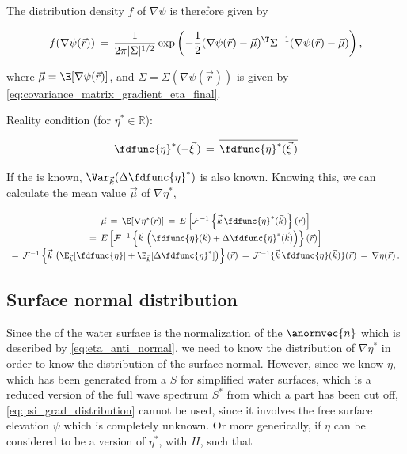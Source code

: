 The distribution density $f$ of $\nabla\psi$ is therefore given by

\begin{equation} \label{eq:psi_grad_distribution}
f(\nabla\psi(\vec{r})) \,=\, \frac{1}{2\pi|\Sigma|^{1/2}}\exp\left(-\frac{1}{2}(\nabla\psi(\vec{r})-\vec{\mu})^{\T}\Sigma^{-1}(\nabla\psi(\vec{r})-\vec{\mu})\right),
\end{equation}

where $\vec{\mu} = \E[\nabla\psi(\vec{r})]$, and $\Sigma = \Sigma(\nabla\psi(\vec{r}))$ is given by \eqref{eq:covariance_matrix_gradient_eta_final}.

\comment
{
\HRule

Reality condition (for $\eta^*\in\mathbb{R}$):

\begin{equation}
\fdfunc{\eta}^*(-\vec{\xi}\,) \,=\, \overline{\fdfunc{\eta}^*(\vec{\xi}\,)}
\end{equation}

\HRule

If the  is known, $\Var_{\vec{k}}(\Delta\fdfunc{\eta}^*)$ is also known. Knowing this, we can calculate the mean value $\vec{\mu}$ of $\nabla\eta^*$,

\begin{equation}
\renewcommand*{\arraystretch}{1.5}
\begin{array}{c}
\vec{\mu} \,=\, \E[\nabla\eta^*(\vec{r})] \,=\, E\left[\mathcal{F}^{-1}\left\{\vec{k}\,\fdfunc{\eta}^*(\vec{k})\right\}(\vec{r})\right] \\
=\, E\left[\mathcal{F}^{-1}\left\{\vec{k}\,\left(\fdfunc{\eta}(\vec{k})+\Delta\fdfunc{\eta}^*(\vec{k})\right)\right\}(\vec{r})\right] \\
=\, \mathcal{F}^{-1}\left\{\vec{k}\,\left(\E_{\vec{k}}[\fdfunc{\eta}]+\E_{\vec{k}}[\Delta\fdfunc{\eta}^*]\right)\right\}(\vec{r}) \,=\, \mathcal{F}^{-1}\{\vec{k}\,\fdfunc{\eta}(\vec{k})\}(\vec{r}) \,=\, \nabla\eta(\vec{r})\,.
\end{array}
\end{equation}

\HRule
}

\subsection{Surface normal distribution}

Since the  of the water surface is the normalization of the  $\anormvec{n}$ which is described by \eqref{eq:eta_anti_normal}, we need to know the distribution of $\nabla\eta^*$ in order to know the distribution of the surface normal. However, since we know $\eta$, which has been generated from a  $S$ for simplified water surfaces, which is a reduced version of the full wave spectrum $S^*$ from which a part has been cut off, \eqref{eq:psi_grad_distribution} cannot be used, since it involves the free surface elevation $\psi$ which is completely unknown. Or more generically, if $\eta$ can be considered to be a  version of $\eta^*$, with  $H$, such that


